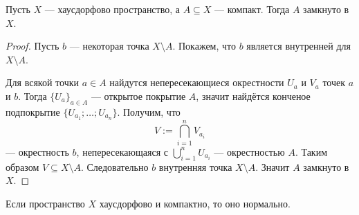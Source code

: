 \documentclass[12pt,a4paper]{article}
\DeclareMathOperator*{\bigtimes}{\text{\raisebox{-6pt}{\scalebox{3}{$\times$}}}}
\begin{document}

    \begin{theorem}
        Пусть $X$ --- хаусдорфово пространство, а $A \subseteq X$ --- компакт. Тогда $A$ замкнуто в $X$.
    \end{theorem}

    \begin{proof}
        Пусть $b$ --- некоторая точка $X \setminus A$. Покажем, что $b$ является внутренней для $X \setminus A$.

        Для всякой точки $a \in A$ найдутся непересекающиеся окрестности $U_a$ и $V_a$ точек $a$ и $b$. Тогда $\{U_a\}_{a \in A}$ --- открытое покрытие $A$, значит найдётся конченое подпокрытие $\{U_{a_1}; \dots; U_{a_n}\}$. Получим, что
        \[V := \bigcap_{i=1}^n V_{a_i}\]
        --- окрестность $b$, непересекающаяся с $\bigcup_{i=1}^n U_{a_i}$ --- окрестностью $A$. Таким образом $V \subseteq X \setminus A$. Следовательно $b$ внутренняя точка $X \setminus A$. Значит $A$ замкнуто в $X$.
    \end{proof}

    \begin{theorem}
        Если пространство $X$ хаусдорфово и компактно, то оно нормально.
    \end{theorem}
\end{document}
